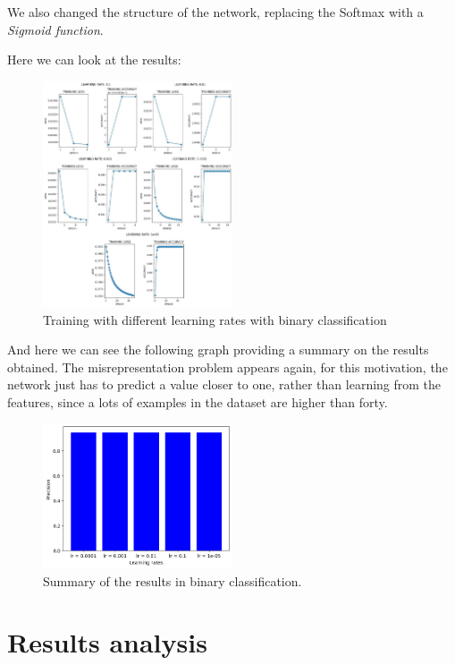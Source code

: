 \documentclass{article}
\begin{document}
We also changed the structure of the network, replacing the Softmax with a \emph{Sigmoid function}.

Here we can look at the results:

\begin{figure}
    \centering
    \includegraphics[width=0.5\textwidth]{binary_lr.jpg}
    \caption{\label{fig:binary_lr}Training with different learning rates with binary classification}
\end{figure}

And here we can see the following graph providing a summary on the results obtained. The misrepresentation problem appears again, 
for this motivation, the network just has to predict a value closer to one, rather than learning from the features, since a lots of examples in the dataset
are higher than forty.

\begin{figure}
    \centering
    \includegraphics[width=0.5\textwidth]{binary_results.png}
    \caption{\label{fig:binary_summary}Summary of the results in binary classification.}
\end{figure}

\section{Results analysis}
\end{document}
